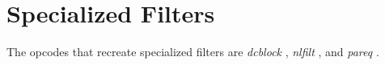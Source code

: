 \begin{comment}
\documentclass[10pt]{article}
\usepackage{fullpage, graphicx, url}
\setlength{\parskip}{1ex}
\setlength{\parindent}{0ex}
\title{Specialized Filters}



\begin{tabular}{ccc}
The Alternative Csound Reference Manual & & \\
Previous &Signal Modifiers &Next

\end{tabular}

\end{comment}
\section{Specialized Filters}


  The opcodes that recreate specialized filters are \emph{dcblock}
, \emph{nlfilt}
, and \emph{pareq}
. 


\begin{comment}
\begin{tabular}{lcr}
Previous &Home &Next \\
Special Effects &Up &Standard Filters

\end{tabular}



\end{comment}
